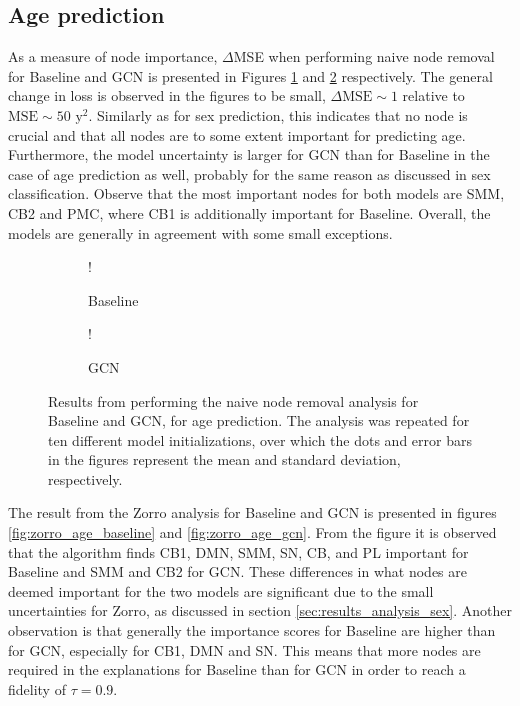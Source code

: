 \subsection{Age prediction}
As a measure of node importance, $\Delta$MSE when performing naive node removal for Baseline and GCN is presented in Figures \ref{fig:naive_age_baseline} and \ref{fig:naive_age_gcn} respectively. The general change in loss is observed in the figures to be small, $\Delta\text{MSE}\sim1$ relative to $\text{MSE}\sim50\text{ y}^2$. Similarly as for sex prediction, this indicates that no node is crucial and that all nodes are to some extent important for predicting age. Furthermore, the model uncertainty is larger for GCN than for Baseline in the case of age prediction as well, probably for the same reason as discussed in sex classification. Observe that the most important nodes for both models are SMM, CB2 and PMC, where CB1 is additionally important for Baseline. Overall, the models are generally in agreement with some small exceptions. 
\begin{figure}[H]
    \centering
        \begin{subfigure}{.5\textwidth}
            \centering
            \begin{center}
                \resizebox {1.0\linewidth} {!} {
                    
                }
            \end{center}
            \caption{Baseline}
            \label{fig:naive_age_baseline}
        \end{subfigure}%
        \begin{subfigure}{.5\textwidth}
            \centering
            \begin{center}
                \resizebox {1.0\linewidth} {!} {
                    
                }
            \end{center}
            \caption{GCN}
            \label{fig:naive_age_gcn}
        \end{subfigure}
    \caption{Results from performing the naive node removal analysis for Baseline and GCN, for age prediction. The analysis was repeated for ten different model initializations, over which the dots and error bars in the figures represent the mean and standard deviation, respectively.}
    \label{fig:naive_age}
\end{figure}
The result from the Zorro analysis for Baseline and GCN is presented in figures \ref{fig:zorro_age_baseline} and \ref{fig:zorro_age_gcn}. From the figure it is observed that the algorithm finds CB1, DMN, SMM, SN, CB, and PL important for Baseline and SMM and CB2 for GCN. These differences in what nodes are deemed important for the two models are significant due to the small uncertainties for Zorro, as discussed in section \ref{sec:results_analysis_sex}. Another observation is that generally the importance scores for Baseline are higher than for GCN, especially for CB1, DMN and SN. This means that more nodes are required in the explanations for Baseline than for GCN in order to reach a fidelity of $\tau=0.9$.

